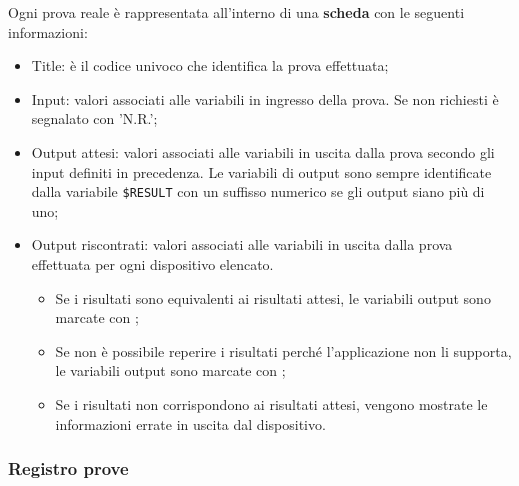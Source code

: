 \documentclass[../../Sperimentazione.tex]{subfiles}
\begin{document}
			Ogni prova reale è rappresentata all'interno di una \textbf{scheda} con le seguenti informazioni:
			\begin{itemize}
				\item Title: è il codice univoco che identifica la prova effettuata;
				\item Input: valori associati alle variabili in ingresso della prova. Se non richiesti è segnalato con 'N.R.';
				\item Output attesi: valori associati alle variabili in uscita dalla prova secondo gli input definiti in precedenza. Le variabili di output sono sempre identificate dalla variabile \verb|$RESULT| con un suffisso numerico se gli output siano più di uno;
				\item Output riscontrati: valori associati alle variabili in uscita dalla prova effettuata per ogni dispositivo elencato. 
				\begin{itemize}
					\item Se i risultati sono equivalenti ai risultati attesi, le variabili output sono marcate con \ok;
					\item Se non è possibile reperire i risultati perché l'applicazione non li supporta, le variabili output sono marcate con \ns;
					\item Se i risultati non corrispondono ai risultati attesi, vengono mostrate le informazioni errate in uscita dal dispositivo.
				\end{itemize}
			\end{itemize}
			
		
			
		\subsubsection{Registro prove}
		
\end{document}

